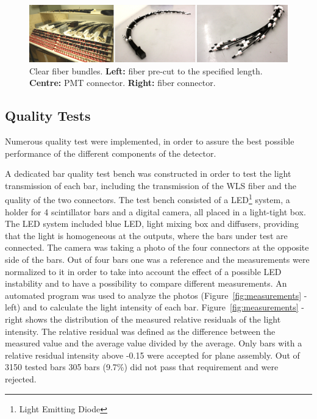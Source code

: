 \documentclass[a4paper,11pt]{article}
\begin{document}
\begin{figure}[htp!]
 \centering
 \includegraphics[width=\textwidth]{./fiber_bundles}
 \caption[Clear fiber bundles]{Clear fiber bundles. {\bf Left:} fiber pre-cut to the specified length. {\bf Centre:} PMT connector. {\bf Right:} fiber connector.}
 \label{fig:fiber_bundles}
\end{figure}

\subsection{Quality Tests}\label{construction:subsec:quality_tests}

Numerous quality test were implemented, in order to assure the best possible performance of the different components of the detector. 

A dedicated bar quality test bench was constructed in order to test the light transmission of each bar, including the transmission of the WLS fiber and the
quality of the two connectors. The test bench consisted of a LED\footnote{Light Emitting Diode} system, a holder for 4 scintillator bars and a digital camera,
all placed in a light-tight box. The LED system included blue LED, light mixing box and diffusers, providing that the light is homogeneous at the outputs,
where the bars under test are connected. The camera was taking a photo of the four connectors at the opposite side of the bars. Out of four bars one was a
reference and the measurements were normalized to it in order to take into account the effect of a possible LED instability and to have a possibility to
compare different measurements. An automated program was used to analyze the photos (Figure~\ref{fig:measurements} - left) and to calculate the light
intensity of each bar. Figure~\ref{fig:measurements} - right shows the distribution of the measured relative residuals of the light intensity. The relative
residual was defined as the difference between the measured value and the average value divided by the average. Only bars with a relative residual
intensity above -0.15 were accepted for plane assembly. Out of 3150 tested bars 305 bars (9.7\%) did not pass that requirement and were rejected.
\end{document}
